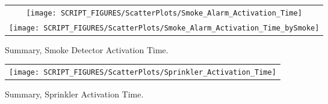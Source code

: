 \begin{figure}
\begin{tabular*}{\textwidth}{c}
\texttt{[image: SCRIPT\_FIGURES/ScatterPlots/Smoke\_Alarm\_Activation\_Time]} \\
\texttt{[image: SCRIPT\_FIGURES/ScatterPlots/Smoke\_Alarm\_Activation\_Time\_bySmoke]}
\end{tabular*}
\caption[Summary, Smoke Detector Activation Time]
{Summary, Smoke Detector Activation Time.}
\label{fig:Activation_Scatter}
\end{figure}

\begin{figure}
\begin{tabular*}{\textwidth}{c}
\texttt{[image: SCRIPT\_FIGURES/ScatterPlots/Sprinkler\_Activation\_Time]}
\end{tabular*}
\caption{Summary, Sprinkler Activation Time.} \label{fig:Activation_Scatter2}
\end{figure}





